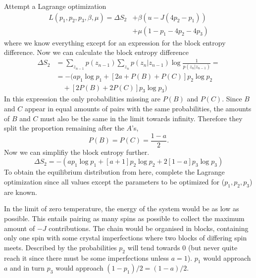 \documentclass[a4paper, 12pt]{article}
\begin{document}
Attempt a Lagrange optimization
\begin{equation}
    \begin{split}
        L(p_1, p_2, p_3, \beta, \mu) = \Delta S_2 & + \beta ( u - J(4p_2 - p_1))  \\
        & + \mu ( 1 - p_1 - 4 p_2 - 4 p_3 )
    \end{split}
\end{equation}
where we know everything except for an expression for the block entropy difference. Now we can calculate the block entropy difference
\begin{equation}
    \begin{array}{ll}
        \Delta S_2 & = \sum_{z_{n-1}} p(z_{n-1}) \sum_{z_n} p(z_n|z_{n-1}) \log \frac{1}{p(z_n|z_{n-1})} = \\
        & = - ( a p_1 \log p_1 + [2a + P(B) + P(C)] p_2 \log p_2  \\
        & \hspace{1em} + [2P(B) + 2P(C)] p_3 \log p_3 )
    \end{array}
\end{equation}
In this expression the only probabilities missing are $P(B)$ and $P(C)$. Since $B$ and $C$ appear in equal amounts of pairs with the same probabilities, the amounts of $B$ and $C$ must also be the same in the limit towards infinity. Therefore they split the proportion remaining after the $A$'s,
\begin{equation}
    P(B) = P(C) = \frac{1-a}{2}.
\end{equation}
Now we can simplifiy the block entropy further.
\begin{equation}
    \Delta S_2 =  - \left( a p_1 \log p_1 + [a + 1] p_2 \log p_2 + 2 [ 1 - a] p_3 \log p_3 \right)
\end{equation}
To obtain the equilibrium distribution from here, complete the Lagrange optimization since all values except the parameters to be optimized for ($p_1, p_2, p_3$) are known.

In the limit of zero temperature, the energy of the system would be as low as possible. This entails pairing as many spins as possible to collect the maximum amount of $-J$ contributions. The chain would be organised in blocks, containing only one spin with some crystal imperfections where two blocks of differing spin meets. Described by the probabilities $p_2$ will tend towards 0 (but never quite reach it since there must be some imperfections unless $a=1$). $p_1$ would approach $a$ and in turn $p_3$ would approach $(1 - p_1)/2 = (1-a)/2$.
\end{document}
